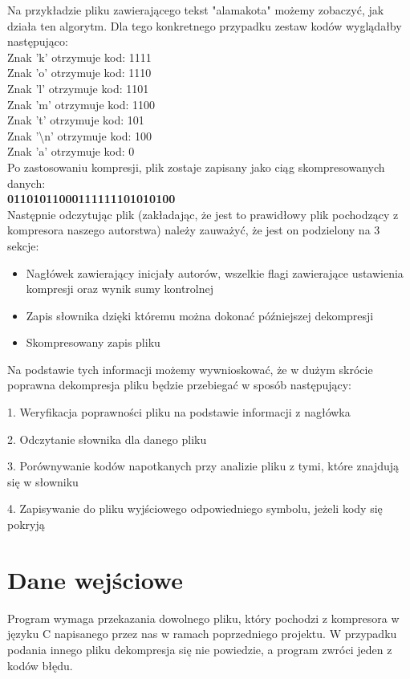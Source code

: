 \documentclass[]{article}
\begin{document}
Na przykładzie pliku zawierającego tekst "alamakota" możemy zobaczyć, jak działa ten algorytm. Dla tego konkretnego przypadku zestaw kodów wyglądałby następująco:\\
Znak 'k' otrzymuje kod: 1111\\
Znak 'o' otrzymuje kod: 1110\\
Znak 'l' otrzymuje kod: 1101\\
Znak 'm' otrzymuje kod: 1100\\
Znak 't' otrzymuje kod: 101\\
Znak '\textbackslash n' otrzymuje kod: 100\\
Znak 'a' otrzymuje kod: 0\\

Po zastosowaniu kompresji, plik zostaje zapisany jako ciąg skompresowanych danych:\\
\textbf{01101011000111111101010100}\\

Następnie odczytując plik (zakładając, że jest to prawidłowy plik pochodzący z kompresora naszego autorstwa) należy zauważyć, że jest on podzielony na 3 sekcje:
\begin{itemize}
\item
Nagłówek zawierający inicjały autorów, wszelkie flagi zawierające ustawienia kompresji oraz wynik sumy kontrolnej
\item
Zapis słownika dzięki któremu można dokonać późniejszej dekompresji
\item
Skompresowany zapis pliku
\end{itemize}
Na podstawie tych informacji możemy wywnioskować, że w dużym skrócie poprawna dekompresja pliku będzie przebiegać w sposób następujący:
\begin{numerize}
\item 
1. Weryfikacja poprawności pliku na podstawie informacji z nagłówka
\item
2. Odczytanie słownika dla danego pliku
\item
3. Porównywanie kodów napotkanych przy analizie pliku z tymi, które znajdują się w słowniku
\item 
4. Zapisywanie do pliku wyjściowego odpowiedniego symbolu, jeżeli kody się pokryją
\end{numerize}
\section{Dane wejściowe}\label{header-n233}
Program wymaga przekazania dowolnego pliku, który pochodzi z kompresora w języku C napisanego przez nas w ramach poprzedniego projektu. W przypadku podania innego pliku dekompresja się nie powiedzie, a program zwróci jeden z kodów błędu.
\end{document}
